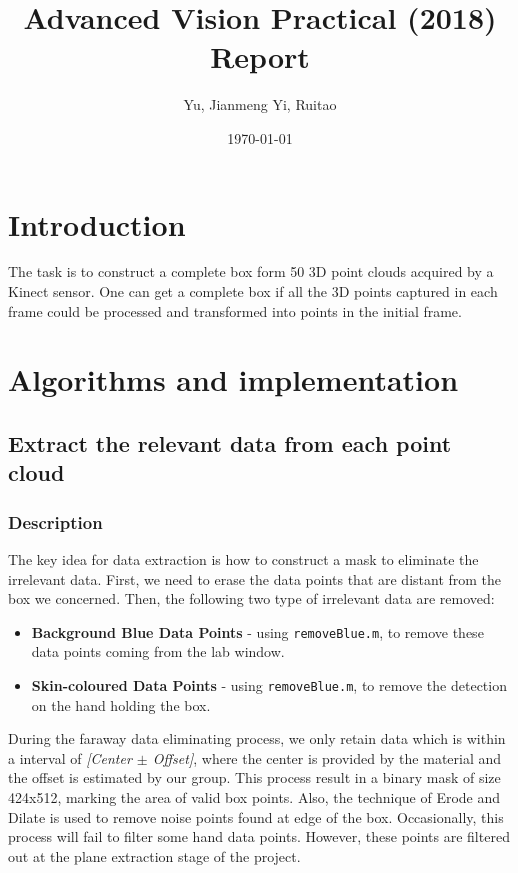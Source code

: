 \documentclass[10pt,a4paper]{article}
\title{Advanced Vision Practical
 (2018) Report}               %
\author{Yu, Jianmeng \quad Yi, Ruitao }                      %
\date{\today}                 %
\begin{document}
\maketitle  %
%
\section{Introduction}
The task is to construct a complete box form 50 3D point clouds acquired by a Kinect sensor. One can get a complete box if all the 3D points captured in each frame could be processed and transformed into points in the initial frame. 

\section{Algorithms and implementation}
\subsection{Extract the relevant data from each point cloud}  
\subsubsection{Description}
The key idea for data extraction is how to construct a mask to eliminate the irrelevant data. First, we need to erase the data points that are distant from the box we concerned. 
Then, the following two type of irrelevant data are removed: 
\begin{itemize}
   \setlength{\parskip}{-1pt}
	\item \textbf{Background Blue Data Points} - using {\tt removeBlue.m}, to remove these data points coming from the lab window.
	\item \textbf{Skin-coloured Data Points} -  using {\tt removeBlue.m}, to remove the detection on the hand holding the box.
\end{itemize} 
During the faraway data eliminating process, we only retain data which is within a interval of \emph{[Center $\pm$ Offset]}, where the center is provided by the material and the offset is estimated by our group. 
This process result in a binary mask of size 424x512, marking the area of valid box points.
Also, the technique of Erode and Dilate is used to remove noise points found at edge of the box.
Occasionally, this process will fail to filter some hand data points.
However, these points are filtered out at the plane extraction stage of the project.
\end{document}
